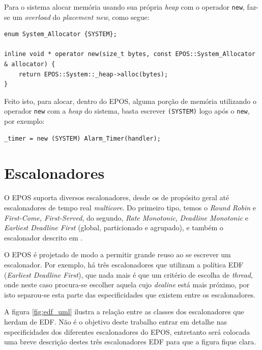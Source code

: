 Para o sistema alocar memória usando sua própria \emph{heap} com o operador \verb+new+, faz-se um \emph{overload} do \emph{placement new}, como segue:

\begin{lstlisting}
enum System_Allocator {SYSTEM};

inline void * operator new(size_t bytes, const EPOS::System_Allocator & allocator) {
    return EPOS::System::_heap->alloc(bytes);
}
\end{lstlisting}

Feito isto, para alocar, dentro do EPOS, alguma porção de memória utilizando o operador \verb+new+ com a \emph{heap} do sistema, basta escrever \verb+(SYSTEM)+ logo após o \verb+new+, por exemplo:

\begin{lstlisting}
_timer = new (SYSTEM) Alarm_Timer(handler);
\end{lstlisting}


\section{Escalonadores}


O EPOS suporta diversos escalonadores, desde os de propósito geral até escalonadores de tempo real \emph{multicore}.
Do primeiro tipo, temos o \emph{Round Robin} e \emph{First-Come, First-Served}, do segundo, \emph{Rate Monotonic}, \emph{Deadline Monotonic} e \emph{Earliest Deadline First} (global, particionado e agrupado), e também o escalonador descrito em \cite{gio}.


O EPOS é projetado de modo a permitir grande reuso ao se escrever um escalonador. Por exemplo, há três escalonadores que utilizam a política EDF (\emph{Earliest Deadline First}), que nada mais é que um critério de escolha de \emph{thread}, onde neste caso procura-se escolher aquela cujo \emph{dealine} está mais próximo, por isto separou-se esta parte das especificidades que existem entre os escalonadores. 

A figura \ref{fig:edf_uml} ilustra a relação entre as classes dos escalonadores que herdam de EDF.  Não é o objetivo deste trabalho entrar em detalhe nas especificidades dos diferentes escalonadores do EPOS, entretanto será colocada uma breve descrição destes três escalonadores EDF para que a figura fique clara.

